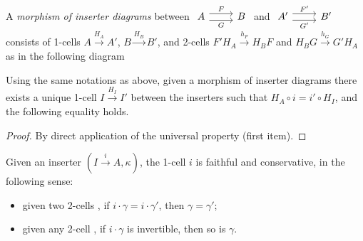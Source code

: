  \begin{definition}
   A \emph{morphism of inserter diagrams} between
   $
   \begin{tikzcd}
     A \doublerightarrow{r}{F}{G} & B
   \end{tikzcd}
   $
   and 
   $
   \begin{tikzcd}
     A' \doublerightarrow{r}{F'}{G'} & B'
   \end{tikzcd}
   $
   consists of 1-cells $A \xrightarrow{H_A} A'$, $B\xrightarrow{H_B} B'$, and
   2-cells $  F' H_A \xrightarrow{h_F}  H_BF$ and $H_B G \xrightarrow{h_G} G' H_A$
   as in the following diagram
   \[

     \]
   \end{definition}

      \begin{lemma}
   \label{lem:mor-inserter}
   Using the same notations as above, given a morphism of inserter diagrams
   there exists a unique
   1-cell $I\xrightarrow{H_I}I'$ between the inserters such that $H_A ∘ i = i' ∘
   H_I$, and the following equality holds.
  \[

  \]
  \end{lemma}
  \begin{proof}
   By direct application of the universal property (first item).
  \end{proof}
  \begin{lemma}
    Given an inserter $(I\xrightarrow{i}A, κ)$, 
    the 1-cell $i$ is faithful and conservative, in the following sense:
    \begin{itemize}
      \item 
        given two 2-cells
        $

        $, if $ i· γ = i· γ'$, then $γ = γ'$;
    \item 
      given any 2-cell
      $
      
      $, if $i· γ$ is invertible, then so is $γ$.
    \end{itemize}
  \end{lemma}




